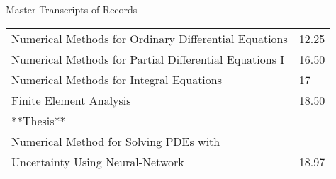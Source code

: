 \begin{cSection}{Master Transcripts of Records}
\begin{tabular}{ @{} >{}l l }
		Numerical Methods for Ordinary Differential Equations & 12.25 \\%
		Numerical Methods for Partial Differential Equations I & 16.50 \\%
		Numerical Methods for Integral Equations  & 17 \\%
		Finite Element Analysis & 18.50 \\%
		**Thesis**& \\%
		Numerical Method for Solving PDEs with\\ Uncertainty Using Neural-Network  &18.97\\%
	\end{tabular}

\vspace*{1cm}

\end{cSection}
